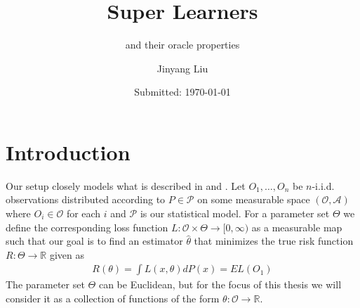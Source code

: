 \documentclass[11pt, a4paper]{article}
\author{Jinyang Liu}
\title{Super Learners}
\subtitle{and their oracle properties}
\date{Submitted: \today}
\theoremstyle{definition}
\theoremstyle{remark}
\begin{document}
\begingroup
    \selectfont
    \maketitle
    \tableofcontents
    \newpage
\endgroup


\section{Introduction}
Our setup closely models what is described in \cite{vaart06} and \cite{laan03}. 
Let $ O_1, \ldots, O_n $ be $ n $-i.i.d. observations distributed according to $ P \in \mathcal{P} $ on some measurable space $ (\mathcal{O}, \mathcal{A}) $ where $ O_{i} \in \mathcal{O} $ for each $ i $ and $ \mathcal{P} $ is our statistical model. For a parameter set $ \Theta $ we define the corresponding loss function $ L : \mathcal{O} \times \Theta \to [0, \infty) $ as a measurable map such that our goal is to find an estimator $ \hat{\theta}  $ that minimizes the true risk function $ R: \Theta \to \mathbb{R} $ given as
\begin{align*}
    R(\theta) = \int L(x, \theta)  dP(x) = EL(O_1) 
\end{align*}
The parameter set $ \Theta $ can be Euclidean, but for the focus of this thesis we will consider it as a collection of functions of the form $ \theta : \mathcal{O} \to \mathbb{R} $. 
\end{document}
